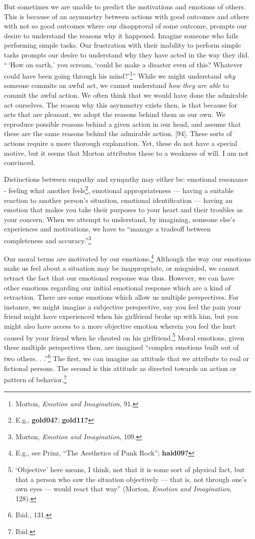 \documentclass[phdthesis,12pt,final]{wuthesis}
\theoremstyle{definition}
\theoremstyle{definition}
\theoremstyle{definition}
\theoremstyle{definition}
\theoremstyle{remark}
\begin{document}
But sometimes we are unable to predict the motivations and emotions of others. This is because of an asymmetry between actions with good outcomes and others
with not so good outcomes where our disapproval of some outcome, prompts our desire to understand the reasons why it happened. Imagine someone who fails performing simple tasks. Our frustration with their inability to perform simple tasks prompts our desire to understand why they have acted in the way they did. ``\,`How on earth,' you scream, `could he make a disaster even of this? Whatever could have been going through his mind?'\footnote{Morton, \emph{Emotion and {Imagination}}, 91.}'' While we might understand \emph{why} someone commits an awful act, we cannot understand \emph{how they are able} to commit the awful action. We often think that we would have done the admirable act ourselves. The reason why this asymmetry exists then, is that because for acts that are pleasant, we adopt the reasons behind them as our own. We reproduce possible reasons behind a given action in our head, and assume that these are the same reasons behind the admirable action.
{[}94{]}. These sorts of actions require a more thorough explanation. Yet, these do not have a special motive, but it seems that Morton attributes these to a weakness of will. I am not convinced.

Distinctions between empathy and sympathy may either be: emotional resonance - feeling what another feels\footnote{E.g., \textbf{gold04?}; \textbf{gold11?}}, emotional appropriateness --- having a suitable reaction to another person's situation, emotional identification --- having an emotion that makes you take their purposes to your heart
and their troubles as your concern. When we attempt to understand, by imagining, someone else's experiences and motivations, we have to
``manage a tradeoff between completeness and accuracy.''\footnote{Morton, \emph{Emotion and {Imagination}}, 109.}

Our moral terms are motivated by our emotions.\footnote{E.g., see Prinz, {``The {Aesthetics} of {Punk Rock}''}; \textbf{haid09?}} Although the way our emotions make us feel about a situation may be inappropriate, or misguided, we cannot retract the fact that our emotional response was thus. However, we can have other emotions regarding our initial emotional response which are a kind of retraction. There are some emotions which allow us multiple perspectives. For instance, we might imagine a subjective perspective, say you feel the pain your friend might have experienced when his girlfriend broke up with him, but you might also have access to a more objective emotion wherein you feel the hurt caused by your friend when he cheated on his girlfriend.\footnote{`Objective' here means, I think, not that it is some sort of physical fact, but that a person who saw the situation objectively --- that is, not through one's own eyes --- would react that way'' (Morton, \emph{Emotion and {Imagination}}, 128).} Moral emotions, given these multiple perspectives then, are imagined ``complex emotions built out of two others. . .''\footnote{Ibid., 131.} The first, we can imagine an attitude that we attribute to real or fictional persons. The second is this attitude as directed towards an action or pattern of behavior.\footnote{Ibid.}
\end{document}
